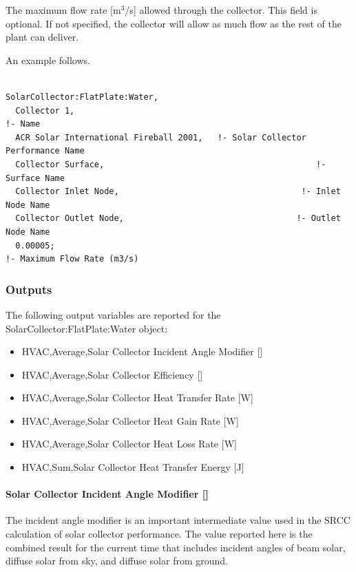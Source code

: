The maximum flow rate {[}m\(^{3}\)/s{]} allowed through the collector. This field is optional. If not specified, the collector will allow as much flow as the rest of the plant can deliver.

An example follows.

\begin{lstlisting}

SolarCollector:FlatPlate:Water,
  Collector 1,                                                       !- Name
  ACR Solar International Fireball 2001,   !- Solar Collector Performance Name
  Collector Surface,                                           !- Surface Name
  Collector Inlet Node,                                     !- Inlet Node Name
  Collector Outlet Node,                                   !- Outlet Node Name
  0.00005;                                                               !- Maximum Flow Rate (m3/s)
\end{lstlisting}

\subsubsection{Outputs}\label{outputs-034}

The following output variables are reported for the SolarCollector:FlatPlate:Water object:

\begin{itemize}
\item
  HVAC,Average,Solar Collector Incident Angle Modifier {[]}
\item
  HVAC,Average,Solar Collector Efficiency {[]}
\item
  HVAC,Average,Solar Collector Heat Transfer Rate {[}W{]}
\item
  HVAC,Average,Solar Collector Heat Gain Rate {[}W{]}
\item
  HVAC,Average,Solar Collector Heat Loss Rate {[}W{]}
\item
  HVAC,Sum,Solar Collector Heat Transfer Energy {[}J{]}
\end{itemize}

\paragraph{Solar Collector Incident Angle Modifier {[]}}\label{solar-collector-incident-angle-modifier}

The incident angle modifier is an important intermediate value used in the SRCC calculation of solar collector performance. The value reported here is the combined result for the current time that includes incident angles of beam solar, diffuse solar from sky, and diffuse solar from ground.

